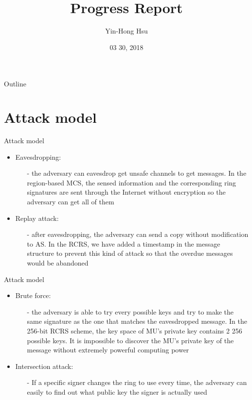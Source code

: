 \documentclass{beamer}
\title {
    Progress Report
}
\author {
    Yin-Hong Hsu
}
\date {
    03 30, 2018
}
\begin{document}
\begin{frame}
    \titlepage
\end{frame}


\begin{frame}{Outline}
    \tableofcontentsgather
    \tableofcontents
\end{frame}

\section{Attack model}
\begin{frame}{Attack model}
    \begin{itemize}
        \item {Eavesdropping:}
        \begin{itemize}
            \item[-] the adversary can eavesdrop get unsafe channels to get messages. In the region-based MCS, the sensed information and the corresponding ring signatures are sent through the Internet without encryption so the adversary can get all of them
        \end{itemize}
        \item {Replay attack:}
        \begin{itemize}
            \item[-] after eavesdropping, the adversary can send a copy without modification to AS. In the RCRS, we have added a timestamp in the message structure to prevent this kind of attack so that the overdue messages would be abandoned
        \end{itemize}
    \end{itemize}
\end{frame}
\begin{frame}{Attack model}
    \begin{itemize}
        \item {Brute force:}
        \begin{itemize}
            \item[-] the adversary is able to try every possible keys and try to make the same signature as the one that matches the eavesdropped message. In the 256-bit RCRS scheme, the key space of MU’s private key contains 2 256 possible keys. It is impossible to discover the MU’s private key of the message without extremely powerful computing power
        \end{itemize}
        \item {Intersection attack:}
        \begin{itemize}
            \item[-] If a specific signer changes the ring to use every time, the adversary can easily to find out what public key the signer is actually used
        \end{itemize}
    \end{itemize}
\end{frame}
\end{document}
